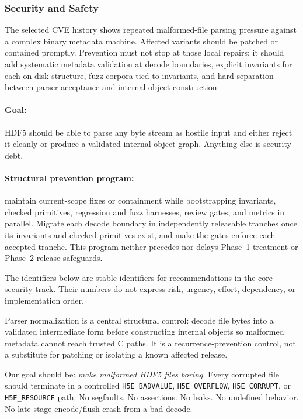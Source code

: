 \documentclass[../main.tex]{subfiles}
\begin{document}
\subsubsection{Security and Safety}

The selected CVE history shows repeated malformed-file parsing pressure
against a complex binary metadata machine.
Affected variants should be patched or contained promptly. Prevention must not
stop at those local repairs: it should add systematic metadata validation at
decode boundaries, explicit invariants for each on-disk structure, fuzz corpora
tied to invariants, and hard separation between parser acceptance and internal
object construction.

\paragraph{Goal:} HDF5 should be able to parse any byte stream as hostile input
and either reject it cleanly or produce a validated internal object graph.
Anything else is security debt.

\paragraph{Structural prevention program:} maintain current-scope fixes or
containment while bootstrapping invariants, checked primitives, regression and
fuzz harnesses, review gates, and metrics in parallel. Migrate each decode
boundary in independently releasable tranches once its invariants and checked
primitives exist, and make the gates enforce each accepted tranche. This
program neither precedes nor delays Phase~1 treatment or Phase~2 release
safeguards.

The  identifiers below are stable identifiers for recommendations
in the core-security track. Their numbers do not express risk, urgency, effort,
dependency, or implementation order.

Parser normalization is a central structural control: decode file bytes into a
validated intermediate form before constructing internal objects so malformed
metadata cannot reach trusted C paths. It is a recurrence-prevention control,
not a substitute for patching or isolating a known affected release.

Our goal should be: \textit{make malformed HDF5 files boring}.
Every corrupted file should terminate in a controlled
\texttt{H5E\_BADVALUE}, \texttt{H5E\_OVERFLOW}, \texttt{H5E\_CORRUPT},
or \texttt{H5E\_RESOURCE} path. No segfaults. No assertions. No leaks.
No undefined behavior. No late-stage encode/flush crash from a bad
decode.
\end{document}
